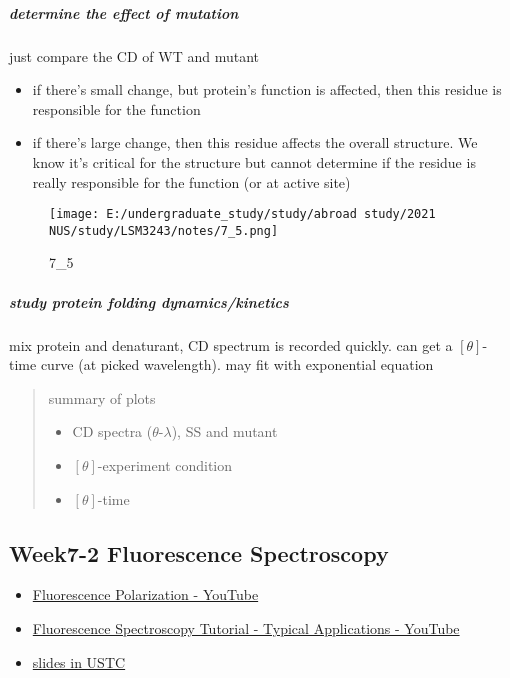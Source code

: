 \documentclass[]{article}
\let\oldsubparagraph\subparagraph
\renewcommand{\subparagraph}[1]{\oldsubparagraph{#1}\mbox{}}
\begin{document}
\hypertarget{determine-the-effect-of-mutation}{%
\subparagraph{determine the effect of
mutation}\label{determine-the-effect-of-mutation}}

just compare the CD of WT and mutant

\begin{itemize}
\item
  if there's small change, but protein's function is affected, then this
  residue is responsible for the function
\item
  if there's large change, then this residue affects the overall
  structure. We know it's critical for the structure but cannot
  determine if the residue is really responsible for the function (or at
  active site)
\end{itemize}

\begin{figure}
\centering
\texttt{[image: E:/undergraduate\_study/study/abroad study/2021 NUS/study/LSM3243/notes/7\_5.png]}
\caption{7\_5}
\end{figure}

\hypertarget{study-protein-folding-dynamicskinetics}{%
\subparagraph{study protein folding
dynamics/kinetics}\label{study-protein-folding-dynamicskinetics}}

mix protein and denaturant, CD spectrum is recorded quickly. can get a
\([\theta]\)-time curve (at picked wavelength). may fit with exponential
equation

\begin{quote}
summary of plots

\begin{itemize}
\item
  CD spectra (\(\theta\)-\(\lambda\)), SS and mutant
\item
  \([\theta]\)-experiment condition
\item
  \([\theta]\)-time
\end{itemize}
\end{quote}

\hypertarget{week7-2-fluorescence-spectroscopy}{%
\subsection{Week7-2 Fluorescence
Spectroscopy}\label{week7-2-fluorescence-spectroscopy}}

\begin{itemize}
\item
  \href{https://www.youtube.com/watch?v=OdBNVrPvJMY}{Fluorescence
  Polarization - YouTube}
\item
  \href{https://www.youtube.com/watch?v=MONv05mJu8Y}{Fluorescence
  Spectroscopy Tutorial - Typical Applications - YouTube}
\item
  \href{http://pic.ustc.edu.cn/_upload/article/files/40/4b/b8d018d3435b9990270250f1af43/b6481175-8dc0-4533-a210-b16fdddd6f2f.pdf}{slides
  in USTC}
\end{itemize}
\end{document}

